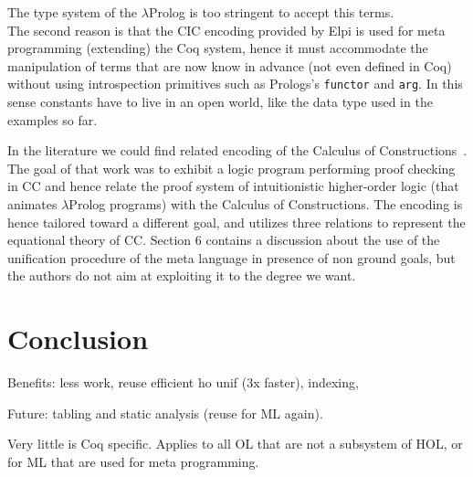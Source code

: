 \documentclass[sigconf,natbib=false,review]{acmart}
\begin{document}
\noindent
The type system of the $\lambda$Prolog is too stringent to accept this terms.\\
The second reason is that the CIC encoding provided by Elpi is used for meta
programming (extending) the Coq system, hence it must accommodate the
manipulation of terms that are now know in advance (not even defined in Coq)
without using introspection primitives such as Prologs's \texttt{functor}
and \texttt{arg}. In this sense constants have to live in an open world, like
the  data type used in the examples so far.

In the literature we could find related encoding of the Calculus of
Constructions~\cite{felty93lics}. The goal of that work was to exhibit
a logic program performing proof checking in CC and hence relate the
proof system of intuitionistic higher-order logic (that animates $\lambda$Prolog
programs) with the Calculus of Constructions. The encoding is hence tailored
toward a different goal, and utilizes three relations to represent the
equational theory of CC. Section 6 contains a discussion about the use of the
unification procedure of the meta language in presence of non ground goals, but
the authors do not aim at exploiting it to the degree we want.


\section{Conclusion}

Benefits: less work, reuse efficient ho unif (3x faster), indexing,

Future: tabling and static analysis (reuse for ML again).

Very little is Coq specific. Applies to all OL that are not a subsystem of 
HOL, or for ML that are used for meta programming.

\printbibliography

\clearpage


\end{document}
